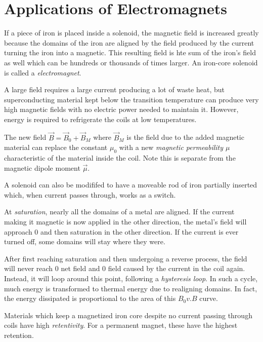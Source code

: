 \section{Applications of Electromagnets}

\begin{definition}[Electromagnet]
    If a piece of iron is placed inside a solenoid, the magnetic field is increased greatly because the domains of the iron are aligned by the field produced by the current turning the iron into a magnetic. This resulting field is hte sum of the iron's field as well which can be hundreds or thousands of times larger. An iron-core solenoid is called a \emph{electromagnet}.

    A large field requires a large current producing a lot of waste heat, but superconducting material kept below the transition temperature can produce very high magnetic fields with no electric power needed to maintain it. However, energy is required to refrigerate the coils at low temperatures.

    The new field $\vec{B} = \vec{B}_0 + \vec{B}_M$ where $\vec{B}_M$ is the field due to the added magnetic material can replace the constant $\mu_0$ with a new \emph{magnetic permeability $\mu$} characteristic of the material inside the coil. Note this is separate from the magnetic dipole moment $\vec{\mu}$.
\end{definition}
\begin{remark}
    A solenoid can also be modififed to have a moveable rod of iron partially inserted which, when current passes through, works as a switch. 
\end{remark}
\begin{definition}[Saturation]
    At \emph{saturation}, nearly all the domains of a metal are aligned. If the current making it magnetic is now applied in the other direction, the metal's field will approach 0 and then saturation in the other direction. If the current is ever turned off, some domains will stay where they were.
\end{definition}
\begin{definition}[Hysteresis]
    After first reaching saturation and then undergoing a reverse process, the field will never reach 0 net field and 0 field caused by the current in the coil again. Instead, it will loop around this point, following a \emph{hysteresis loop}. In such a cycle, much energy is transformed to thermal energy due to realigning domains. In fact, the energy dissipated is proportional to the area of this $B_0 v. B$ curve.
\end{definition}
\begin{definition}[Retentivity]
    Materials which keep a magnetized iron core despite no current passing through coils have high \emph{retentivity}. For a permanent magnet, these have the highest retention.
\end{definition}

